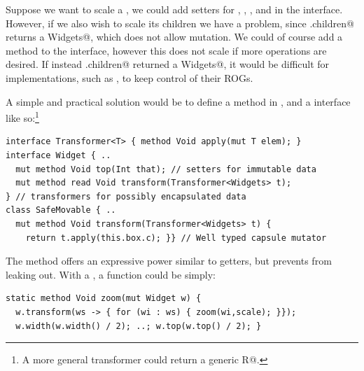 Suppose we want to scale a \Q@Widget@, we could add \Q@mut@ setters for \Q@width@, \Q@height@, \Q@left@, and \Q@top@ in the \Q@Widget@ interface. However, if we also wish to scale its children we have a problem, since \Q@Widget.children@ returns a \Q@read Widgets@, which does not allow mutation. We could of course add a \Q@mut@ method \Q@zoom@ to the \Q@Widget@ interface, however this does not scale if more operations are desired. If instead \Q@Widget.children@ returned a \Q@mut Widgets@, it would be difficult for \Q@Widget@ implementations, such as \Q@SafeMovable@, to keep control of their ROGs.



A simple and practical solution would be to define a \Q@transform@ method in \Q@Widget@, and a \Q@Transformer@ interface 
like so:\footnote{A more general transformer could return a generic \Q@read R@.}
\begin{lstlisting}
interface Transformer<T> { method Void apply(mut T elem); }
interface Widget { ..
  mut method Void top(Int that); // setters for immutable data
  mut method read Void transform(Transformer<Widgets> t);
} // transformers for possibly encapsulated data
class SafeMovable { ..
  mut method Void transform(Transformer<Widgets> t) {
    return t.apply(this.box.c); }} // Well typed capsule mutator
\end{lstlisting}\saveSpace
The \Q@transform@ method offers an expressive power similar to \Q@mut@ getters, but prevents \Q@Widgets@ from leaking out.  With a \Q@Transformer@, a \Q@zoom@ function could be simply:
\begin{lstlisting}
static method Void zoom(mut Widget w) {
  w.transform(ws -> { for (wi : ws) { zoom(wi,scale); }});
  w.width(w.width() / 2); ..; w.top(w.top() / 2); }
\end{lstlisting}

